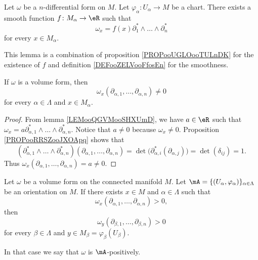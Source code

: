 \begin{lemma}		\label{LEMooQGVMooSHXUmD}
	Let \( \omega\) be a \( n\)-differential form on \( M\). Let \(\varphi_{\alpha} \colon U_{\alpha} \to M  \) be a chart. There exists a smooth function \(f \colon M_{\alpha}\to \eR   \) such that
	\begin{equation}
		\omega_x=f(x)\partial^*_1\wedge\ldots\wedge\partial^*_n
	\end{equation}
	for every \( x\in M_{\alpha}\).
\end{lemma}

This lemma is a combination of proposition \ref{PROPooUGLOooTULnDK} for the existence of \( f\) and definition \ref{DEFooZELVooFfosEn} for the smoothness.


\begin{lemma}	\label{LEMooKJRCooCklXie}
	If \( \omega\) is a volume form, then
	\begin{equation}
		\omega_x(\partial_{\alpha, 1},\ldots,\partial_{\alpha,n})\neq 0
	\end{equation}
	for every \( \alpha\in \Lambda\) and \( x\in M_{\alpha}\).
\end{lemma}

\begin{proof}
	From lemma \ref{LEMooQGVMooSHXUmD}, we have \( a\in \eR\) such that \( \omega_x=a\partial^*_{\alpha,1}\wedge\ldots\wedge\partial^*_{\alpha,n}\). Notice that \( a\neq 0\) because \( \omega_x\neq 0\). Proposition \ref{PROPooRRSZooJXOApq} shows that
	\begin{equation}		\label{EQooRRHNooBVgAnF}
		(\partial^*_{\alpha,1}\wedge\ldots\wedge\partial^*_{\alpha,n})(\partial_{\alpha,1},\ldots,\partial_{\alpha,n})=\det\big( \partial_{\alpha,i}^*(\partial_{\alpha,j}) \big)=\det(\delta_{ij})=1.
	\end{equation}
	Thus \( \omega_x(\partial_{\alpha,1},\ldots,\partial_{\alpha,n})=a\neq 0\).
\end{proof}

\begin{lemmaDef}		\label{LEMooELOHooYtXSEH}
	Let \( \omega\) be a volume form on the connected manifold \( M\). Let \( \mA=\{ (U_{\alpha},\varphi_{\alpha})\}_{\alpha\in\Lambda}\) be an orientation on \( M\). If there exists \( x\in M\) and \( \alpha\in \Lambda\) such that
	\begin{equation}
		\omega_x(\partial_{\alpha,1},\ldots,\partial_{\alpha,n})>0,
	\end{equation}
	then
	\begin{equation}
		\omega_y(\partial_{\beta,1},\ldots,\partial_{\beta,n})>0
	\end{equation}
	for every \( \beta\in\Lambda \) and \( y\in M_{\beta}=\varphi_{\beta}(U_{\beta})\).

	In that case we say that \( \omega\) is  \( \mA\)-positively.
\end{lemmaDef}

